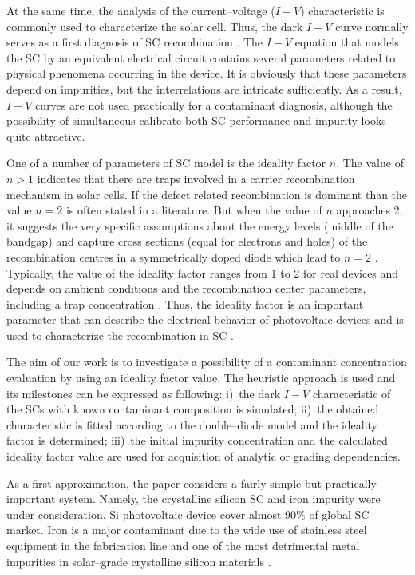 \documentclass [sort&compress] {elsarticle}
\begin{document}
At the same time, the analysis of  the current--voltage ($I-V$)  characteristic is commonly used  to characterize the solar cell.
Thus, the dark $I-V$ curve normally serves as a first diagnosis of SC recombination \cite{Grover}.
The $I-V$  equation that models the SC by an equivalent electrical circuit contains several parameters related to physical phenomena occurring in the device.
It is obviously that these parameters depend on impurities, but the interrelations are intricate sufficiently.
As a result, $I-V$ curves are not used practically for a contaminant diagnosis, although the possibility of simultaneous calibrate both SC performance and impurity looks quite attractive.

One of a number of parameters of SC model is the ideality factor $n$.
The value of $n>1$ indicates that there are traps involved in a carrier recombination mechanism in solar cells.
If the defect related recombination  is dominant than the value $n=2$ is often stated in a literature.
But when the value of $n$ approaches 2, it suggests the  very specific  assumptions about  the  energy levels  (middle  of  the  bandgap) and  capture  cross sections  (equal for electrons and  holes)  of  the recombination centres in a symmetrically  doped diode which lead to $n=2$ \cite{n2Kuhn,n2_Beier}.
Typically, the value of the ideality factor ranges from 1 to 2 for real devices and
depends on ambient conditions and the recombination center parameters, including a trap concentration \cite{n2_Beier,n2McIntosh,n2Kaminski,HAMEIRI2013251,Heide}.
Thus, the ideality factor is an important parameter that can describe the electrical behavior of photovoltaic devices
and is used to characterize the recombination in SC \cite{Duan}.


The aim of our work is to investigate a possibility of  a contaminant concentration evaluation by using an ideality factor value.
The heuristic approach is used and its milestones can be expressed as following:
i)~the dark $I-V$ characteristic of the SCs with known contaminant composition is simulated;
ii)~the obtained characteristic is fitted according to the double--diode model and the ideality factor is determined;
iii)~the initial impurity concentration and the calculated ideality factor value are used for acquisition of analytic or grading dependencies.

As a first approximation, the paper considers a fairly simple but practically important system.
Namely, the crystalline silicon SC and iron impurity were under consideration.
Si photovoltaic device cover almost 90\% of global SC market.
Iron is a major contaminant due to the wide use of stainless steel equipment in the fabrication line and one of the most detrimental metal impurities in solar--grade crystalline silicon materials \cite{Istratov1999,FeB:Schmidt,ZHU2016192}.
\end{document}
